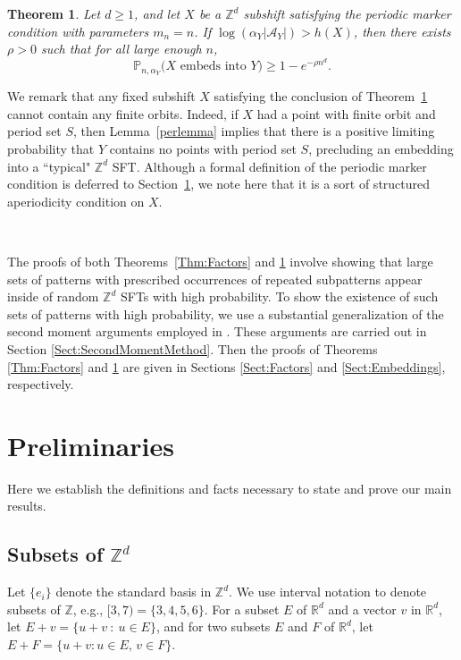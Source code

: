 \documentclass[12pt]{amsart}
\newtheorem{theorem}{Theorem}[section]
\theoremstyle{definition}
\def\Z{\mathbb{Z}}
\begin{document}
\begin{theorem}\label{Thm:Embeddings}
Let $d \geq 1$, and let $X$ be a $\mathbb{Z}^d$ subshift satisfying the periodic marker condition with parameters $m_n = n$. If $\log(\alpha_Y |\mathcal{A}_Y|) > h(X)$, then there exists $\rho>0$ such that for all large enough $n$,
\begin{equation*}
 \mathbb{P}_{n,\alpha_Y} \bigl(X \textrm{ embeds into } Y \bigr) \geq 1 - e^{-\rho n^d}.
 \end{equation*}
\end{theorem}

We remark that any fixed subshift $X$ satisfying the conclusion of Theorem~\ref{Thm:Embeddings} cannot contain any finite orbits. Indeed, if $X$ had a point with finite orbit and period set $S$, then Lemma~\ref{perlemma} implies that there is a positive limiting probability that $Y$ contains no points with period set $S$, precluding an embedding into a ``typical" $\mathbb{Z}^d$ SFT. Although a formal definition of the periodic marker condition is deferred to Section~\ref{defs}, we note here that it is a sort of structured aperiodicity condition on $X$.

\

The proofs of both Theorems~\ref{Thm:Factors} and \ref{Thm:Embeddings} involve showing that large sets of patterns with prescribed occurrences of repeated subpatterns appear inside of random $\Z^d$ SFTs with high probability. To show the existence of such sets of patterns with high probability, we use a substantial generalization of the second moment arguments employed in \cite{McGoff,McGoffPavlov}. These arguments are carried out in Section \ref{Sect:SecondMomentMethod}. Then the proofs of Theorems \ref{Thm:Factors} and \ref{Thm:Embeddings} are given in Sections \ref{Sect:Factors} and \ref{Sect:Embeddings}, respectively.

\section{Preliminaries}\label{defs}

Here we establish the definitions and facts necessary to state and prove our main results.

\subsection{Subsets of $\mathbb{Z}^d$} \label{Sect:Subsets}

Let $\{e_i\}$ denote the standard basis in $\mathbb{Z}^d$. We use interval notation to denote subsets of $\mathbb{Z}$, e.g., $[3,7) = \{3,4,5,6\}$. For a subset $E$ of $\mathbb{R}^d$ and a vector $v$ in $\mathbb{R}^d$, let $E+v = \{u+v \ : \ u \in E\}$, and for two subsets $E$ and $F$ of $\mathbb{R}^d$, let $E + F = \{ u+v : u \in E, \, v \in F \}$. 
\end{document}
